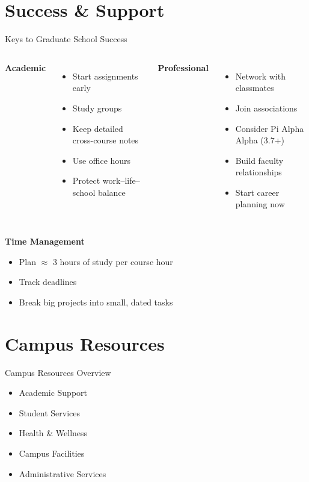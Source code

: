 \documentclass[10pt]{beamer}
\begin{document}
\section{Success \& Support}
\begin{frame}{Keys to Graduate School Success}
\begin{columns}[T,onlytextwidth]
  \textbf{Academic}
  \begin{itemize}
    \item Start assignments early
    \item Study groups
    \item Keep detailed cross-course notes
    \item Use office hours
    \item Protect work–life–school balance
  \end{itemize}
  \textbf{Professional}
  \begin{itemize}
    \item Network with classmates
    \item Join associations
    \item Consider Pi Alpha Alpha (3.7+)
    \item Build faculty relationships
    \item Start career planning now
  \end{itemize}
\end{columns}

\vspace{0.4em}
\textbf{Time Management}
\begin{itemize}
  \item Plan \(\approx\) 3 hours of study per course hour
  \item Track deadlines
  \item Break big projects into small, dated tasks
\end{itemize}
\end{frame}

\section{Campus Resources}
\begin{frame}{Campus Resources Overview}
\begin{itemize}
  \item Academic Support
  \item Student Services
  \item Health \& Wellness
  \item Campus Facilities
  \item Administrative Services
\end{itemize}
\end{frame}
\end{document}
